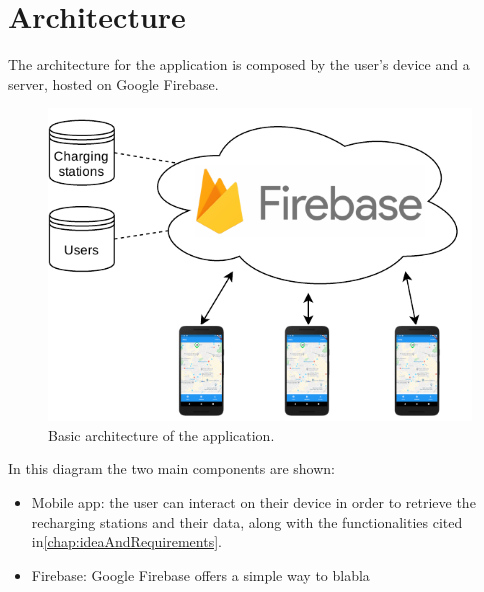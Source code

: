 \chapter{Architecture}%
\label{chap:architecture}
The architecture for the application is composed by the user's device and a server, hosted on Google Firebase.
\begin{figure}[htpb]
    \centering
    \includegraphics[width=0.9\linewidth]{Pics/architecture.pdf}
    \caption{Basic architecture of the application.}%
    \label{fig:Pics/architecture}
\end{figure}
In this diagram the two main components are shown:
\begin{itemize}
    \item Mobile app: the user can interact on their device in order to retrieve the recharging stations and their data, along with the functionalities cited in\ref{chap:ideaAndRequirements}.
    \item Firebase: Google Firebase offers a simple way to blabla
\end{itemize}

